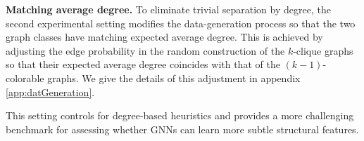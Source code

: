 





\textbf{Matching average degree.}
To eliminate trivial separation by degree, the second experimental setting modifies the data-generation process so that the two graph classes have matching expected average degree. This is achieved by adjusting the edge probability in the random construction of the $k$-clique graphs so that their expected average degree coincides with that of the $(k\!-\!1)$-colorable graphs. We give the details of this adjustment in appendix \ref{app:datGeneration}.

This setting controls for degree-based heuristics and provides a more challenging benchmark for assessing whether GNNs can learn more subtle structural features.




